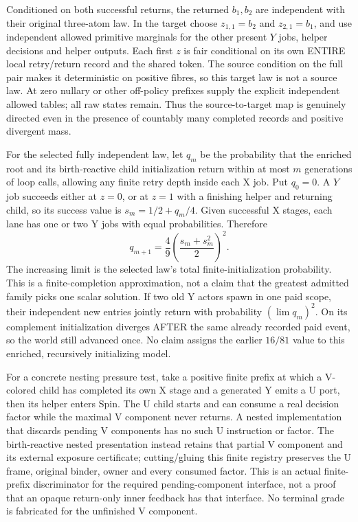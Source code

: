 \documentclass{article}
\begin{document}
Conditioned on both successful returns, the returned $b_1,b_2$ are independent with their original three-atom law. In the target choose $z_{1,1}=b_2$ and $z_{2,1}=b_1$, and use independent allowed primitive marginals for the other present $Y$ jobs, helper decisions and helper outputs. Each first $z$ is fair conditional on its own ENTIRE local retry/return record and the shared token. The source condition on the full pair makes it deterministic on positive fibres, so this target law is not a source law. At zero nullary or other off-policy prefixes supply the explicit independent allowed tables; all raw states remain. Thus the source-to-target map is genuinely directed even in the presence of countably many completed records and positive divergent mass.

For the selected fully independent law, let $q_m$ be the probability that the enriched root and its birth-reactive child initialization return within at most $m$ generations of loop calls, allowing any finite retry depth inside each X job. Put $q_0=0$. A $Y$ job succeeds either at $z=0$, or at $z=1$ with a finishing helper and returning child, so its success value is $s_m=1/2+q_m/4$. Given successful X stages, each lane has one or two Y jobs with equal probabilities. Therefore
\[
 q_{m+1}=\frac49\left(\frac{s_m+s_m^2}{2}\right)^2.
\]
The increasing limit is the selected law's total finite-initialization probability. This is a finite-completion approximation, not a claim that the greatest admitted family picks one scalar solution. If two old Y actors spawn in one paid scope, their independent new entries jointly return with probability $(\lim q_m)^2$. On its complement initialization diverges AFTER the same already recorded paid event, so the world still advanced once. No claim assigns the earlier $16/81$ value to this enriched, recursively initializing model.

For a concrete nesting pressure test, take a positive finite prefix at which a V-colored child has completed its own X stage and a generated Y emits a U port, then its helper enters Spin. The U child starts and can consume a real decision factor while the maximal V component never returns. A nested implementation that discards pending V components has no such U instruction or factor. The birth-reactive nested presentation instead retains that partial V component and its external exposure certificate; cutting/gluing this finite registry preserves the U frame, original binder, owner and every consumed factor. This is an actual finite-prefix discriminator for the required pending-component interface, not a proof that an opaque return-only inner feedback has that interface. No terminal grade is fabricated for the unfinished V component.
\end{document}
